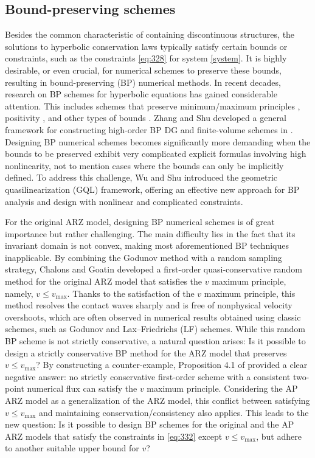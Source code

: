 \documentclass[times,final]{elsarticle}
\numberwithin{equation}{section}
\theoremstyle{definition}
\theoremstyle{remark}
\begin{document}
\subsection{Bound-preserving schemes}\label{sec:195}
Besides the common characteristic of containing discontinuous structures, the solutions to hyperbolic conservation laws typically satisfy certain bounds or constraints, such as the constraints \eqref{eq:328} for system \eqref{system}. It is highly desirable, or even crucial, for numerical schemes to preserve these bounds, resulting in bound-preserving (BP) numerical methods. 
In recent decades, research on BP schemes for hyperbolic equations has gained considerable attention. This includes schemes that preserve minimum/maximum principles \cite{zhang2010maximum,xu2014parametrized,Lv2014EntropyboundedDG,AndersoDobrevKolevKuzminQuezadaRiebenTomov2017}, positivity \cite{zhang2011maximum,wu2018positivity,WuShu2019}, and other types of bounds \cite{wu2021minimum,WuTang2015,wu2017design,mabuza2018local,Dmitri2021}. Zhang and Shu developed a general framework for constructing high-order BP DG and finite-volume schemes in  \cite{zhang2011maximum,zhang2010maximum}.
Designing BP numerical schemes becomes significantly more demanding when the bounds to be preserved exhibit very complicated explicit formulas involving high nonlinearity, not to mention cases where the bounds can only be implicitly defined. To address this challenge, Wu and Shu \cite{wu2023geometric} introduced the geometric quasilinearization (GQL) framework, offering an effective new approach for BP analysis and design with nonlinear and complicated constraints.

For the original ARZ model, designing BP numerical schemes is of great importance but rather challenging. The main difficulty lies in the fact that its invariant domain is not convex, making most aforementioned BP techniques inapplicable. By combining the Godunov method with a random sampling strategy, Chalons and Goatin \cite{chalons2007transport} developed a first-order quasi-conservative random method for the original ARZ model that satisfies the \( v \) maximum principle, namely, \( v \le v_{\max} \). Thanks to the satisfaction of the \( v \) maximum principle, this method resolves the contact waves sharply and is free of nonphysical velocity overshoots, which are often observed in numerical results obtained using classic schemes, such as Godunov and Lax–Friedrichs (LF) schemes. 
While this random BP scheme is not strictly conservative, a natural question arises: Is it possible to design a strictly conservative BP method for the ARZ model that preserves \( v \le v_{\max} \)? By constructing a counter-example, Proposition 4.1 of \cite{betancourt2018random} provided a clear negative answer: no strictly conservative first-order scheme with a consistent two-point numerical flux can satisfy the \( v \) maximum principle. 
Considering the AP ARZ model as a generalization of the ARZ model, this conflict between satisfying \( v \le v_{\max} \) and maintaining conservation/consistency also applies. This leads to the new question: Is it possible to design BP schemes for the original and the AP ARZ models that satisfy the constraints in \eqref{eq:332} except \( v \le v_{\max} \), but adhere to another suitable upper bound for \( v \)?
\end{document}
